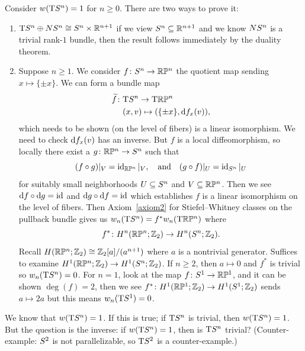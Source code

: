 \begin{example}\label{ex:w-ts-is-one}
Consider $w(\mathrm{T}S^{n})=1$ for $n\geq0$. There are two ways to prove it:
\begin{enumerate}
\item $\mathrm{T}S^{n}\oplus NS^{n}\cong S^{n}\times\mathbb{R}^{n+1}$ if
  we view $S^{n}\subseteq\mathbb{R}^{n+1}$ and we know $NS^{n}$ is a
  trivial rank-$1$ bundle, then the result follows immediately by the
  duality theorem.
\item Suppose $n\geq1$. We consider $f\colon S^{n}\to\mathbb{R}\mathbb{P}^{n}$ the
  quotient map sending $x\mapsto\{\pm x\}$. We can form a bundle map
  \begin{align}
\widetilde{f}\colon & \mathrm{T}S^{n}\to\mathrm{T}\mathbb{R}\mathbb{P}^{n}\\
& (x,v)\mapsto(\{\pm x\},\mathrm{d} f_{x}(v))\nonumber,
  \end{align}
  which needs to be shown (on the level of fibers) is a linear
  isomorphism. We need to check $\mathrm{d} f_{x}(v)$ has an inverse. But $f$
  is a local diffeomorphism, so locally there exist a $g\colon\mathbb{R}\mathbb{P}^{n}\to S^{n}$
  such that
  \begin{equation}
(f\circ g)|_{V}=\operatorname{id}_{\mathbb{R}\mathbb{P}^{n}}|_{V},\quad\mbox{and}\quad(g\circ f)|_{U}=\operatorname{id}_{S^{n}}|_{U}
  \end{equation}
  for suitably small neighborhoods $U\subseteq S^{n}$ and $V\subseteq\mathbb{R}\mathbb{P}^{n}$.
  Then we see $\mathrm{d} f\circ\mathrm{d} g=\operatorname{id}$ and $\mathrm{d} g\circ\mathrm{d} f=\operatorname{id}$ which
  establishes $f$ is a linear isomorphism on the level of fibers. Then
  Axiom~\ref{axiom2} for Stiefel--Whitney classes on the pullback
  bundle gives us $w_{n}(\mathrm{T}S^{n})=f^{*}w_{n}(\mathrm{T}\mathbb{R}\mathbb{P}^{n})$ where
  \begin{equation}
f^{*}\colon H^{n}(\mathbb{R}\mathbb{P}^{n};\mathbb{Z}_{2})\to H^{n}(S^{n};\mathbb{Z}_{2}).
  \end{equation}
  Recall $H(\mathbb{R}\mathbb{P}^{n};\mathbb{Z}_{2})\cong\mathbb{Z}_{2}[a]/(a^{n+1})$ where $a$ is a
  nontrivial generator. Suffices to examine $H^{1}(\mathbb{R}\mathbb{P}^{n};\mathbb{Z}_{2})\to H^{1}(S^{n};\mathbb{Z}_{2})$.
  If $n\geq2$, then $a\mapsto0$ and $f^{*}$ is trivial so
  $w_{n}(\mathrm{T}S^{n})=0$. For $n=1$, look at the map
  $f\colon S^{1}\to\mathbb{R}\mathbb{P}^{1}$, and it can be shown $\deg(f)=2$, then
  we see $f^{*}\colon H^{1}(\mathbb{R}\mathbb{P}^{1};\mathbb{Z}_{2})\to H^{1}(S^{1};\mathbb{Z}_{2})$
  sends $a\mapsto2a$ but this means $w_{n}(\mathrm{T}S^{1})=0$.
\end{enumerate}
\end{example}

\begin{remark}
We know that $w(\mathrm{T}S^{n})=1$. If this is true; if $\mathrm{T}S^{n}$
is trivial, then $w(\mathrm{T}S^{n})=1$. But the question is the inverse:
if $w(\mathrm{T}S^{n})=1$, then is $\mathrm{T}S^{n}$ trivial?
(Counter-example: $S^{2}$ is not parallelizable, so
$\mathrm{T}S^{2}$ is a counter-example.)
\end{remark}

